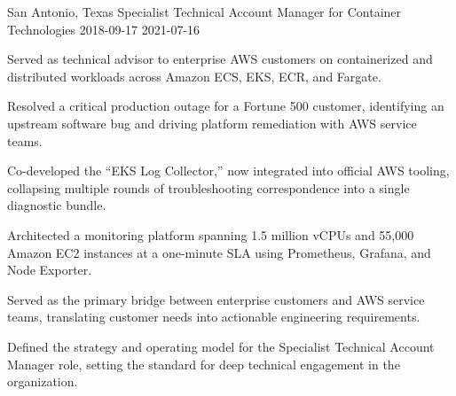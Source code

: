 \begin{role}
{\companyaws}
{San Antonio, Texas}
{Specialist Technical Account Manager for Container Technologies}
{2018-09-17}
{2021-07-16}
    \item Served as technical advisor to enterprise AWS customers on containerized and distributed workloads across Amazon ECS, EKS, ECR, and Fargate.
    \item Resolved a critical production outage for a Fortune 500 customer, identifying an upstream software bug and driving platform remediation with AWS service teams.
    \item Co-developed the ``EKS Log Collector,'' now integrated into official AWS tooling, collapsing multiple rounds of troubleshooting correspondence into a single diagnostic bundle.
    \item Architected a monitoring platform spanning 1.5 million vCPUs and 55,000 Amazon EC2 instances at a one-minute SLA using Prometheus, Grafana, and Node Exporter.
    \item Served as the primary bridge between enterprise customers and AWS service teams, translating customer needs into actionable engineering requirements.
    \item Defined the strategy and operating model for the Specialist Technical Account Manager role, setting the standard for deep technical engagement in the organization.
\end{role}

